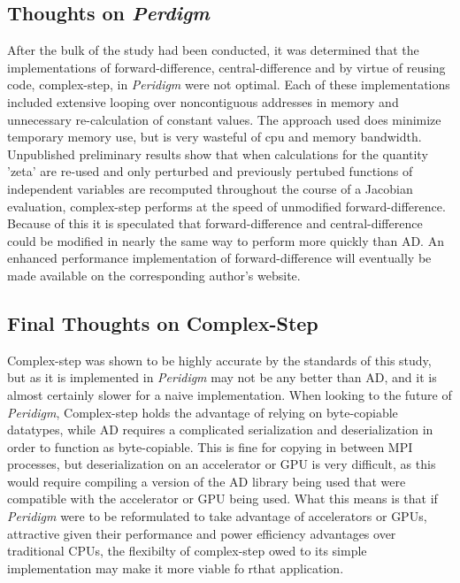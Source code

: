 \documentclass[preprint,12pt]{elsarticle}
\begin{document}
\subsection{Thoughts on \emph{Perdigm}}

After the bulk of the study had been conducted, it was determined that the implementations of
forward-difference, central-difference and by virtue of reusing code, complex-step, in \emph{Peridigm} were
not optimal. Each of these implementations included extensive looping over noncontiguous addresses
in memory and unnecessary re-calculation of constant values. The approach used does minimize
temporary memory use, but is very wasteful of cpu and memory bandwidth. Unpublished preliminary results show
that when calculations for the quantity 'zeta' are re-used and only perturbed and previously
pertubed functions of independent variables are recomputed throughout the course of a Jacobian
evaluation, complex-step performs at the speed of unmodified forward-difference. Because of this it is
speculated that forward-difference and central-difference could be modified in nearly the same way to
perform more quickly than AD. An enhanced performance implementation of forward-difference will
eventually be made available on the corresponding author's website.

\subsection{Final Thoughts on Complex-Step} Complex-step was shown to be highly accurate by the
standards of this study, but as it is implemented in \emph{Peridigm} may not be any better than AD,
and it is almost certainly slower for a naive implementation. When looking to the future of
\emph{Peridigm}, Complex-step holds the advantage of relying on byte-copiable datatypes, while AD
requires a complicated serialization and deserialization in order to function as byte-copiable. This
is fine for copying in between MPI processes, but deserialization on an accelerator or GPU is very
difficult, as this would require compiling a version of the AD library being used that were
compatible with the accelerator or GPU being used. What this means is that if \emph{Peridigm} were
to be reformulated to take advantage of accelerators or GPUs, attractive given their performance and
power efficiency advantages over traditional CPUs, the flexibilty of complex-step owed to its simple
implementation may make it more viable fo rthat application.
\end{document}

